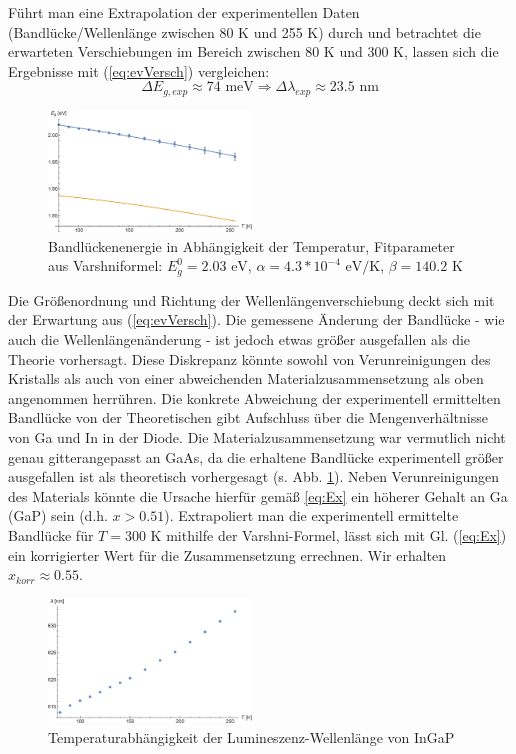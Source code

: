 \documentclass[aps,twocolumn,secnumarabic,nobalancelastpage,amsmath,amssymb,
nofootinbib,superscriptaddress]{revtex4-1}
\begin{document}
Führt man eine Extrapolation der experimentellen Daten (Bandlücke/Wellenlänge zwischen 80 K und 255 K) durch und
betrachtet die erwarteten Verschiebungen im Bereich zwischen 80 K und 300 K, lassen sich die Ergebnisse mit (\ref{eq:evVersch})
vergleichen:
\begin{equation}
  \Delta E_{g,exp}\approx 74\text{ meV} \Rightarrow \Delta\lambda_{exp}\approx 23.5\text{ nm}
   \label{eq:expVersch}
\end{equation}

\begin{figure}[t]
  \centering
  \includegraphics[width=0.48\textwidth]{../Messung/energtemp.eps}
  \caption{\label{fig:EgapT} Bandlückenenergie in Abhängigkeit der Temperatur, Fitparameter
  aus Varshniformel: $E_g^0= 2.03 \text{ eV}$, $ \alpha = 4.3*10^{-4} \text{ eV/K}$, \quad $ \beta = 140.2 \text{ K}$}
\end{figure}

\noindent Die Größenordnung und Richtung der Wellenlängenverschiebung deckt sich mit der Erwartung aus (\ref{eq:evVersch}).
Die gemessene Änderung der Bandlücke - wie auch die Wellenlängenänderung - ist jedoch etwas größer ausgefallen als die Theorie vorhersagt.
Diese Diskrepanz könnte sowohl von Verunreinigungen des Kristalls als auch von einer abweichenden Materialzusammensetzung als oben angenommen
herrühren. Die konkrete Abweichung der experimentell ermittelten Bandlücke von der Theoretischen gibt Aufschluss über die Mengenverhältnisse von
Ga und In in der Diode. Die Materialzusammensetzung war vermutlich nicht genau gitterangepasst an GaAs, da die erhaltene
Bandlücke experimentell größer ausgefallen ist als theoretisch vorhergesagt (s. Abb. \ref{fig:EgapT}). Neben Verunreinigungen des Materials könnte
die Ursache hierfür gemäß \ref{eq:Ex} ein höherer Gehalt an Ga (GaP) sein (d.h. $x>0.51$).
Extrapoliert man die experimentell ermittelte Bandlücke für $T=300\text{ K}$ mithilfe der Varshni-Formel, lässt sich mit Gl. (\ref{eq:Ex})
ein korrigierter Wert für die Zusammensetzung errechnen. Wir erhalten $x_{korr}\approx 0.55$.

\begin{figure}[h]
  \centering
  \includegraphics[width=0.48\textwidth]{../Messung/peaktemp.eps}
  \caption{\label{fig:lamT} Temperaturabhängigkeit der Lumineszenz-Wellenlänge von InGaP}
\end{figure}
\end{document}
